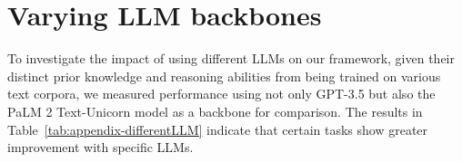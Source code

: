 \documentclass{article}
\theoremstyle{plain}
\theoremstyle{definition}
\theoremstyle{remark}
\begin{document}
\begin{table}[h!]
\centering
\caption{Missing value analysis. Averaged changes of AUC with standard error over 13 datasets across different missing ratios are reported. }
\setlength{\tabcolsep}{3.5pt}

\label{tab:appendix-missing}
\end{table}

\newpage


\section{Varying LLM backbones}
\label{sec:backbones}
To investigate the impact of using different LLMs on our framework, given their distinct prior knowledge and reasoning abilities from being trained on various text corpora, we measured performance using not only GPT-3.5 but also the PaLM 2 Text-Unicorn model as a backbone for comparison. The results in Table~\ref{tab:appendix-differentLLM} indicate that certain tasks show greater improvement with specific LLMs.
\end{document}

